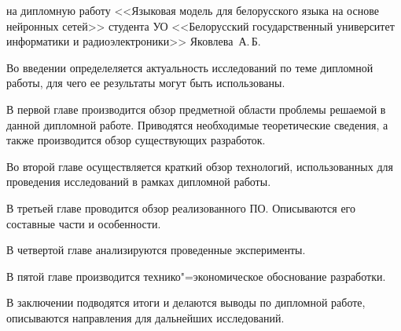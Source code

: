 \thispagestyle{empty}

\begin{center}
  \begin{minipage}{0.82\textwidth}
    на дипломную работу <<Языковая модель для белорусского языка на основе нейронных сетей>> студента УО <<Белорусский государственный университет информатики и радиоэлектроники>> Яковлева~А.\,Б.
  \end{minipage}
\end{center}

Во введении определеляется актуальность исследований по теме дипломной работы, для чего ее результаты могут быть использованы.

В первой главе производится обзор предметной области проблемы решаемой в данной дипломной работе.
Приводятся необходимые теоретические сведения, а также производится обзор существующих разработок.

Во второй главе осуществляется краткий обзор технологий, использованных для проведения исследований в рамках дипломной работы.

В третьей главе проводится обзор реализованного ПО.
Описываются его составные части и особенности.

В четвертой главе анализируются проведенные эксперименты.

В пятой главе производится технико"=экономическое обоснование разработки.

В заключении подводятся итоги и делаются выводы по дипломной работе, описываются направления для дальнейших исследований.

\clearpage